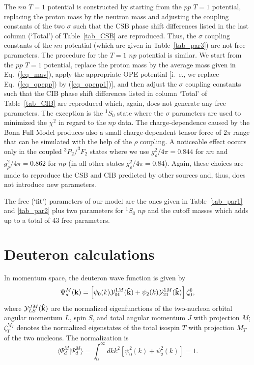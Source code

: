 The $nn$ $T=1$ potential is constructed by starting from the
$pp$ $T=1$ potential, replacing the proton mass by the neutron mass
and adjusting the coupling constants of the two $\sigma$ such
that the CSB phase shift differences listed in the last column
(`Total') of Table~\ref{tab_CSB} are reproduced. Thus, the 
$\sigma$ coupling constants of the $nn$ potential (which are
given in Table~\ref{tab_par3}) are not free parameters.
The procedure for the $T=1$ $np$ potential is similar.
We start from the $pp$ $T=1$ potential, replace the proton mass
by the average mass given in Eq.~(\ref{eq_mav}),
apply the appropriate OPE potential [i.~e., we replace
Eq.~(\ref{eq_opepp}) by (\ref{eq_openp1})],
and then adjust the $\sigma$ coupling constants such that
the CIB phase shift differences listed in column `Total'
of Table~\ref{tab_CIB} are reproduced which, again, does not
generate any free parameters. The exception is the $^1S_0$
state where the $\sigma$ parameters are used to minimized
the $\chi^2$ in regard to the $np$ data. 
The charge-dependence caused by the Bonn Full Model
produces also a small charge-dependent tensor force of
$2\pi$ range that can be simulated with the help of
the $\rho$ coupling. 
A noticeable effect occurs only in the coupled $^3P_2/^3F_2$
states where we use
$g^2_\rho/4\pi=0.844$ for $nn$
 and $g^2_\rho/4\pi=0.862$ for $np$
(in all other states $g^2_\rho/4\pi=0.84$).
Again, these choices are made to reproduce the CSB and CIB
predicted by other sources and, thus, does not introduce
new parameters.

The free (`fit') parameters of our model are the ones
given in Table~\ref{tab_par1} and \ref{tab_par2}
plus two parameters for $^1S_0$ $np$
and the cutoff masses which adds up to a total
of 43 free parameters.





\section{Deuteron calculations}
In momentum space, the deuteron wave function is given by
\begin{equation}
  \Psi_d^M({\bf k}) 
= \left[
  \psi_0(k) {\cal Y}^{1M}_{01}({\bf \hat{k}}) +
  \psi_2(k) {\cal Y}^{1M}_{21}({\bf \hat{k}}) \right]
  \zeta_0^0,                                           \label{DWQ}
\end{equation}
where 
${\cal Y}^{JM}_{LS}({\bf \hat{k}})$
are the normalized eigenfunctions of the two-nucleon
orbital angular momentum $L$, spin $S$, and total angular
momentum $J$ with projection $M$;
$\zeta_T^{M_T}$ denotes the normalized eigenstates of the total
isospin $T$ with projection $M_T$ of the two nucleons.
The normalization is
\begin{equation}
\langle \Psi_d^M | \Psi_d^M \rangle
 =
  \int_0^\infty dk k^2 \left[ \psi_0^2(k) + \psi_2^2(k) \right]=1.
\end{equation}


